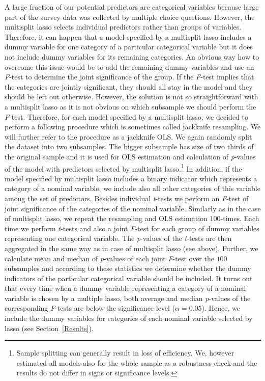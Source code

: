 \documentclass[a4paper,12pt]{article}
\begin{document}
 
A large fraction of our potential predictors are categorical variables because large part of the survey data was collected by multiple choice questions. However, the multisplit lasso selects individual predictors rather than groups of variables. Therefore, it can happen that a model specified by a multisplit lasso includes a dummy variable for one category of a particular categorical variable but it does not include dummy variables for its remaining categories. An obvious way how to overcome this issue would be to add the remaining dummy variables and use an \textit{F}-test to determine the joint significance of the group. If the \textit{F}-test implies that the categories are jointly significant, they should all stay in the model and they should be left out otherwise. However, the solution is not so straightforward with a multisplit lasso as it is not obvious on which subsample we should perform the \textit{F}-test. Therefore, for each model specified by a multisplit lasso, we decided to perform a following procedure which is sometimes called jackknife resampling. We will further refer to the procedure as a jackknife OLS. We again randomly split the dataset into two subsamples. The bigger subsample has size of two thirds of the original sample and it is used for OLS estimation and calculation of \textit{p}-values of the model with predictors selected by multisplit lasso.\footnote{Sample splitting can generally result in loss of efficiency. We, however estimated all models also for the whole sample as a robustness check and the results do not differ in signs or significance levels.} In addition, if the model specified by multisplit lasso includes a binary indicator which represents a category of a nominal variable, we include also all other categories of this variable among the set of predictors. Besides individual \textit{t}-tests we perform an \textit{F}-test of joint significance of the categories of the nominal variable. Similarly as in the case of multisplit lasso, we repeat the resampling and OLS estimation $100$-times. Each time we perform \textit{t}-tests and also a joint \textit{F}-test for each group of dummy variables representing one categorical variable. The \textit{p}-values of the \textit{t}-tests are then aggregated in the same way as in case of multisplit lasso (see above). Further, we calculate mean and median of \textit{p}-values of each joint \textit{F}-test over the $100$ subsamples and according to these statistics we determine whether the dummy indicators of the particular categorical variable should be included. It turns out that every time when a dummy variable representing a category of a nominal variable is chosen by a multiple lasso, both average and median \textit{p}-values of the corresponding \textit{F}-tests are below the significance level (${\alpha=0.05}$). Hence, we include the dummy variables for categories of each nominal variable selected by lasso (see Section~\ref{Results}). %
\end{document}
